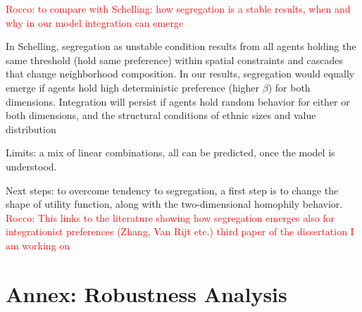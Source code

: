 \documentclass[
]{article}
\begin{document}
{\textcolor{red}{Rocco: to compare with Schelling: how segregation is a stable results, when and why in our model integration can emerge}}

In Schelling, segregation as unstable condition results from all agents
holding the same threshold (hold same preference) within spatial
constraints and cascades that change neighborhood composition. In our
results, segregation would equally emerge if agents hold high
deterministic preference (higher \(\beta\)) for both dimensions.
Integration will persist if agents hold random behavior for either or
both dimensions, and the structural conditions of ethnic sizes and value
distribution

Limits: a mix of linear combinations, all can be predicted, once the
model is understood.

Next steps: to overcome tendency to segregation, a first step is to
change the shape of utility function, along with the two-dimensional
homophily behavior.
{\textcolor{red}{Rocco: This links to the literature showing how segregation emerges also for integrationist preferences (Zhang, Van Rijt etc.) third paper of the dissertation I am working on}}

\hypertarget{annex-robustness-analysis}{%
\section{Annex: Robustness Analysis}\label{annex-robustness-analysis}}
\end{document}
